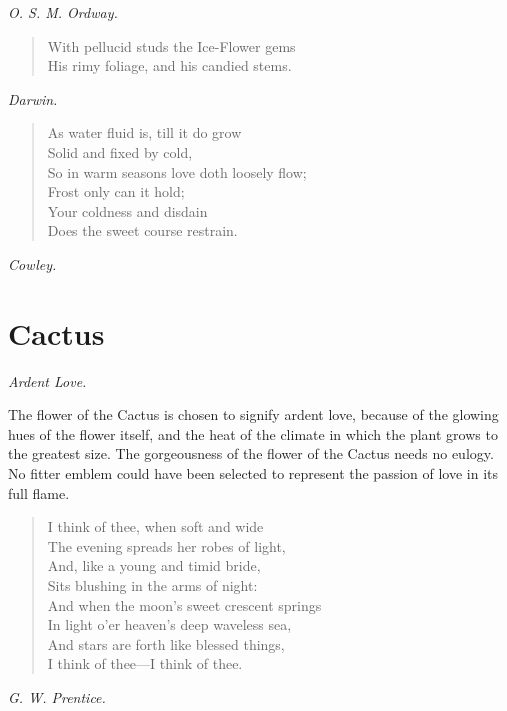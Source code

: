 \documentclass[11pt,twoside]{article}
\newcommand\flower[2]{\section*{#1}\addcontentsline{toc}{section}{#1}%
  \noindent\textit{#2.}\par\medskip}
\newcommand\by[1]{\par\hfill\textit{#1}\par}
\begin{document}
\by{O. S. M. Ordway.}

\begin{verse}
With pellucid studs the Ice-Flower gems\\
His rimy foliage, and his candied stems.
\end{verse}

\by{Darwin.}

\begin{verse}
As water fluid is, till it do grow\\
\quad Solid and fixed by cold,\\
So in warm seasons love doth loosely flow;\\
\quad Frost only can it hold;\\
\quad Your coldness and disdain\\
\quad Does the sweet course restrain.
\end{verse}

\by{Cowley.}

\flower{Cactus}{Ardent Love}

The flower of the Cactus is chosen to signify ardent love, because of the glowing hues of the flower itself, and the heat of the climate in which the plant grows to the greatest size. The gorgeousness of the flower of the Cactus needs no eulogy. No fitter emblem could have been selected to represent the passion of love in its full flame.

\begin{verse}
I think of thee, when soft and wide\\
\quad The evening spreads her robes of light,\\
And, like a young and timid bride,\\
\quad Sits blushing in the arms of night:\\
And when the moon’s sweet crescent springs\\
\quad In light o’er heaven’s deep waveless sea,\\
And stars are forth like blessed things,\\
\quad I think of thee---I think of thee.
\end{verse}

\by{G. W. Prentice.}
\end{document}

